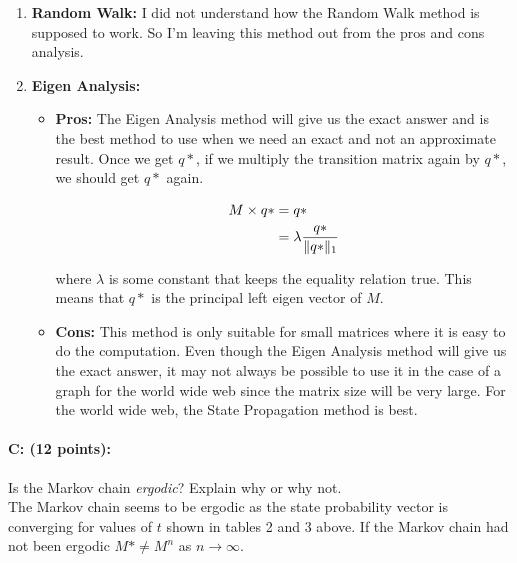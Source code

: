 \documentclass[11pt]{article}
\begin{document}
\begin{enumerate}
\begin{itemize}
\end{itemize}

\item \textbf{Random Walk:} I did not understand how the Random Walk method is supposed to work. So I'm leaving this method out from the pros and cons analysis.

\item \textbf{Eigen Analysis:}

\begin{itemize}

\item \textbf{Pros:} The Eigen Analysis method will give us the exact answer and is the best method to use when we need an exact and not an approximate result. Once we get $q*$, if we multiply the transition matrix again by $q*$, we should get $q*$ again. 

\begin{equation*}
\begin{aligned}
M \times q* &=  q*\\
&= \lambda  \frac{q*}{\lVert q*\rVert_1}
\end{aligned}
\end{equation*}

where $\lambda$ is some constant that keeps the equality relation true. This means that $q*$ is the principal left eigen vector of $M$. 

\item \textbf{Cons:} This method is only suitable for small matrices where it is easy to do the computation. Even though the Eigen Analysis method will give us the exact answer, it may not always be possible to use it in the case of a graph for the world wide web since the matrix size will be very large. For the world wide web, the State Propagation method is best.

\end{itemize}

\end{enumerate}

\paragraph{C: (12 points):} 

Is the Markov chain \textit{ergodic}? Explain why or why not.\\

The Markov chain seems to be ergodic as the state probability vector is converging for values of $t$ shown in tables 2 and 3 above. If the Markov chain had not been ergodic $M* \neq M^n$ as $n \rightarrow \infty$. \\
\end{document}
